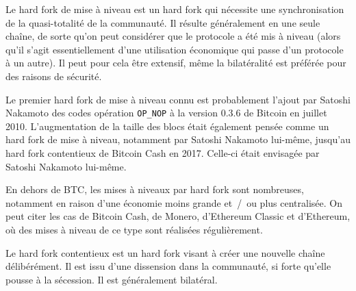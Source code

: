 Le hard fork de mise à niveau est un hard fork qui nécessite une synchronisation de la quasi-totalité de la communauté. Il résulte généralement en une seule chaîne, de sorte qu'on peut considérer que le protocole a été mis à niveau (alors qu'il s'agit essentiellement d'une utilisation économique qui passe d'un protocole à un autre). Il peut pour cela être extensif, même la bilatéralité est préférée pour des raisons de sécurité.

Le premier hard fork de mise à niveau connu est probablement l'ajout par Satoshi Nakamoto des codes opération \texttt{OP\_NOP} à la version 0.3.6 de Bitcoin en juillet 2010. L'augmentation de la taille des blocs était également pensée comme un hard fork de mise à niveau, notamment par Satoshi Nakamoto lui-même, jusqu'au hard fork contentieux de Bitcoin Cash en 2017. Celle-ci était envisagée par Satoshi Nakamoto lui-même.

En dehors de BTC, les mises à niveaux par hard fork sont nombreuses, notamment en raison d'une économie moins grande et~/~ou plus centralisée. On peut citer les cas de Bitcoin Cash, de Monero, d'Ethereum Classic et d'Ethereum, où des mises à niveau de ce type sont réalisées régulièrement.

Le hard fork contentieux est un hard fork visant à créer une nouvelle chaîne délibérément. Il est issu d'une dissension dans la communauté, si forte qu'elle pousse à la sécession. Il est généralement bilatéral.

